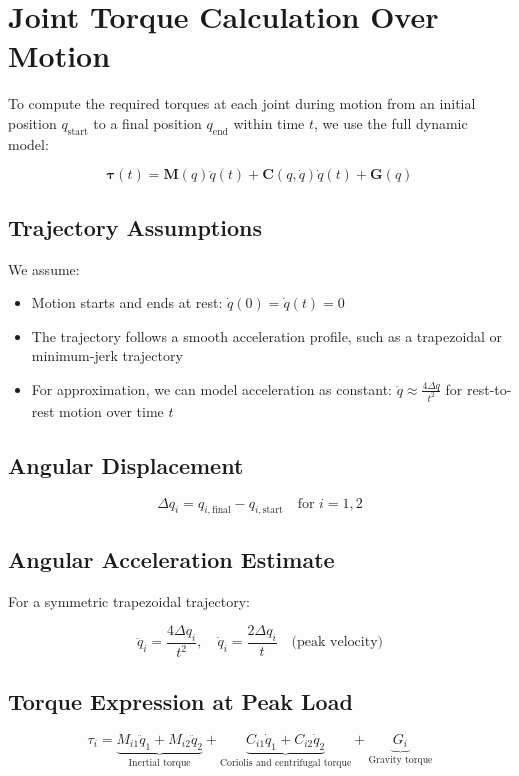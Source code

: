 \documentclass[a4paper,12pt]{article}
\begin{document}
\section*{Joint Torque Calculation Over Motion}

To compute the required torques at each joint during motion from an initial position $q_{\text{start}}$ to a final position $q_{\text{end}}$ within time $t$, we use the full dynamic model:

\[
\boldsymbol{\tau}(t) = \mathbf{M}(q) \ddot{q}(t) + \mathbf{C}(q, \dot{q}) \dot{q}(t) + \mathbf{G}(q)
\]

\subsection*{Trajectory Assumptions}

We assume:
\begin{itemize}
    \item Motion starts and ends at rest: $\dot{q}(0) = \dot{q}(t) = 0$
    \item The trajectory follows a smooth acceleration profile, such as a trapezoidal or minimum-jerk trajectory
    \item For approximation, we can model acceleration as constant: $\ddot{q} \approx \frac{4 \Delta q}{t^2}$ for rest-to-rest motion over time $t$
\end{itemize}

\subsection*{Angular Displacement}

\[
\Delta q_i = q_{i,\text{final}} - q_{i,\text{start}} \quad \text{for } i = 1,2
\]

\subsection*{Angular Acceleration Estimate}

For a symmetric trapezoidal trajectory:

\[
\ddot{q}_i = \frac{4 \Delta q_i}{t^2}, \quad \dot{q}_i = \frac{2 \Delta q_i}{t} \quad \text{(peak velocity)}
\]

\subsection*{Torque Expression at Peak Load}

\[
\tau_i = \underbrace{M_{i1} \ddot{q}_1 + M_{i2} \ddot{q}_2}_{\text{Inertial torque}}
+ \underbrace{C_{i1} \dot{q}_1 + C_{i2} \dot{q}_2}_{\text{Coriolis and centrifugal torque}}
+ \underbrace{G_i}_{\text{Gravity torque}}
\]
\end{document}

